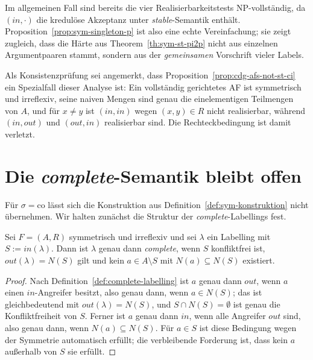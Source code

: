 Im allgemeinen Fall sind bereits die vier Realisierbarkeitstests
NP-vollständig, da \((\mathit{in},\cdot)\) die kredulöse Akzeptanz unter
\textit{stable}-Semantik enthält. Proposition~\ref{prop:sym-singleton-p} ist
also eine echte Vereinfachung; sie zeigt zugleich, dass die Härte aus
Theorem~\ref{th:sym-st-pi2p} nicht aus einzelnen Argumentpaaren stammt, sondern
aus der \emph{gemeinsamen} Vorschrift vieler Labels.

Als Konsistenzprüfung sei angemerkt, dass
Proposition~\ref{prop:cdg-afs-not-st-ci} ein Spezialfall dieser Analyse ist: Ein
vollständig gerichtetes AF ist symmetrisch und irreflexiv, seine naiven Mengen
sind genau die einelementigen Teilmengen von \(A\), und für \(x\neq y\) ist
\((\mathit{in},\mathit{in})\) wegen \((x,y)\in R\) nicht realisierbar, während
\((\mathit{in},\mathit{out})\) und \((\mathit{out},\mathit{in})\) realisierbar
sind. Die Rechteckbedingung ist damit verletzt.

\section{Die \textit{complete}-Semantik bleibt offen}
\label{sec:sym-complete}

Für \(\sigma=\mathrm{co}\) lässt sich die Konstruktion aus
Definition~\ref{def:sym-konstruktion} nicht übernehmen. Wir halten zunächst die
Struktur der \textit{complete}-Labellings fest.

\begin{Proposition}
    \label{prop:sym-co-struktur}
    Sei \(F=(A,R)\) symmetrisch und irreflexiv und sei \(\lambda\) ein
    Labelling mit \(S:=\mathit{in}(\lambda)\). Dann ist \(\lambda\) genau dann
    \textit{complete}, wenn \(S\) konfliktfrei ist,
    \(\mathit{out}(\lambda)=N(S)\) gilt und kein \(a\in A\setminus S\) mit
    \(N(a)\subseteq N(S)\) existiert.
\end{Proposition}

\begin{proof}
    Nach Definition~\ref{def:complete-labelling} ist \(a\) genau dann
    \(\mathit{out}\), wenn \(a\) einen \(\mathit{in}\)-Angreifer besitzt, also
    genau dann, wenn \(a\in N(S)\); das ist gleichbedeutend mit
    \(\mathit{out}(\lambda)=N(S)\), und \(S\cap N(S)=\emptyset\) ist genau die
    Konfliktfreiheit von \(S\). Ferner ist \(a\) genau dann \(\mathit{in}\),
    wenn alle Angreifer \(\mathit{out}\) sind, also genau dann, wenn
    \(N(a)\subseteq N(S)\). Für \(a\in S\) ist diese Bedingung wegen der
    Symmetrie automatisch erfüllt; die verbleibende Forderung ist, dass kein
    \(a\) außerhalb von \(S\) sie erfüllt.
\end{proof}

